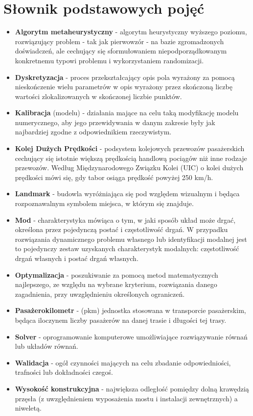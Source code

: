 \section*{Słownik podstawowych pojęć}
\begin{itemize}[label = {},leftmargin=0pt]
\item \textbf{Algorytm metaheurystyczny} - algorytm heurystyczny wyższego poziomu, rozwiązujący problem - tak jak pierwowzór - na bazie zgromadzonych doświadczeń, ale cechujący się sformułowaniem niepodporządkowanym konkretnemu typowi problemu i wykorzystaniem randomizacji. 
\item \textbf{Dyskretyzacja} - proces przekształcający opis pola wyrażony za pomocą nieskończenie wielu parametrów w opis wyrażony przez skończoną liczbę wartości zlokalizowanych w skończonej liczbie punktów.
\item \textbf{Kalibracja} (modelu) - działania mające na celu taką modyfikację modelu numerycznego, aby jego przewidywania w danym zakresie były jak najbardziej zgodne z odpowiednikiem rzeczywistym.
\item \textbf{Kolej Dużych Prędkości} - podsystem kolejowych przewozów pasażerskich cechujący się istotnie większą prędkością handlową pociągów niż inne rodzaje przewozów. Według Międzynarodowego Związku Kolei (UIC) o kolei dużych prędkości mówi się, gdy tabor osiąga prędkość powyżej 250 km/h.
\item \textbf{Landmark} - budowla wyróżniająca się pod względem wizualnym i będąca rozpoznawalnym symbolem miejsca, w którym się znajduje.
\item \textbf{Mod}  -  charakterystyka mówiąca o tym, w jaki sposób układ może drgać, określona przez pojedynczą postać i częstotliwość drgań. W przypadku rozwiązania dynamicznego problemu własnego lub identyfikacji modalnej jest to pojedynczy zestaw uzyskanych charakterystyk modalnych: częstotliwość drgań własnych i postać drgań własnych.
\item \textbf{Optymalizacja} - poszukiwanie za pomocą metod matematycznych najlepszego, ze względu na wybrane kryterium, rozwiązania danego zagadnienia, przy uwzględnieniu określonych ograniczeń.
\item \textbf{Pasażerokilometr} - (pkm) jednostka stosowana w transporcie pasażerskim, będąca iloczynem liczby pasażerów na danej trasie i długości tej trasy.
\item \textbf{Solver} - oprogramowanie komputerowe umożliwiające rozwiązywanie równań lub układów równań.
\item \textbf{Walidacja} - ogół czynności mających na celu zbadanie odpowiedniości, trafności lub dokładności czegoś.
\item \textbf{Wysokość konstrukcyjna} - największa odległość pomiędzy dolną krawędzią przęsła (z uwzględnieniem wyposażenia mostu i instalacji zewnętrznych) a niweletą.

\end{itemize}
\vfill
\pagebreak[4]

